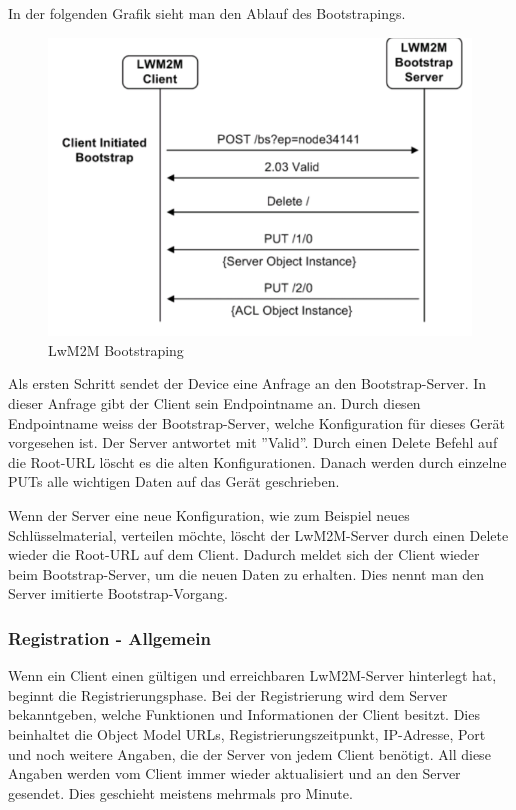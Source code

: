 In der folgenden Grafik sieht man den Ablauf des Bootstrapings.
\begin{figure}[H]
\includegraphics[scale=0.5]{../02_Analyse/images/lwm2m/bootstrap_diagram.png}
\caption{LwM2M Bootstraping\cite{LwM2MInterfaces}}
\end{figure}
Als ersten Schritt sendet der Device eine Anfrage an den Bootstrap-Server. In dieser Anfrage gibt der Client sein Endpointname an. Durch diesen Endpointname weiss der Bootstrap-Server, welche Konfiguration für dieses Gerät vorgesehen ist. Der Server antwortet mit ''Valid''. Durch einen Delete Befehl auf die Root-URL löscht es die alten Konfigurationen. Danach werden durch einzelne PUTs alle wichtigen Daten auf das Gerät geschrieben.

Wenn der Server eine neue Konfiguration, wie zum Beispiel neues Schlüsselmaterial, verteilen möchte, löscht der LwM2M-Server durch einen Delete wieder die Root-URL auf dem Client. Dadurch meldet sich der Client wieder beim Bootstrap-Server, um die neuen Daten zu erhalten. Dies nennt man den  Server imitierte Bootstrap-Vorgang.

\subsubsection{Registration - Allgemein}
Wenn ein Client einen gültigen und erreichbaren LwM2M-Server hinterlegt hat, beginnt die Registrierungsphase. Bei der Registrierung wird dem Server bekanntgeben, welche Funktionen und Informationen der Client besitzt. Dies beinhaltet die Object Model URLs, Registrierungszeitpunkt, IP-Adresse, Port und noch weitere Angaben, die der Server von jedem Client benötigt. All diese Angaben werden vom Client immer wieder aktualisiert und an den Server gesendet. Dies geschieht meistens mehrmals pro Minute.

